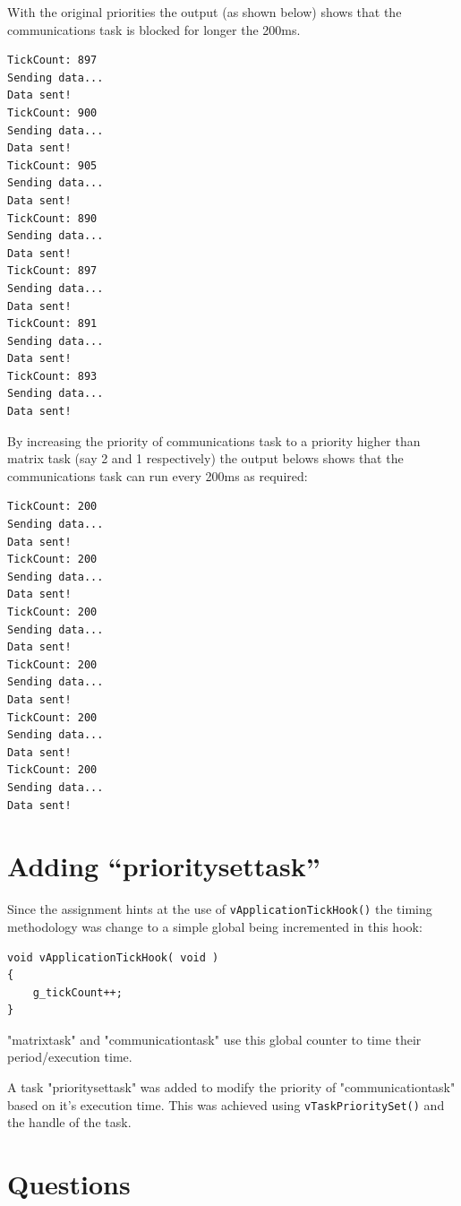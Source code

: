 \documentclass{article}
\begin{document}
With the original priorities the output (as shown below) shows that the communications task is blocked for longer the 200ms.

\begin{lstlisting}
TickCount: 897
Sending data...
Data sent!
TickCount: 900
Sending data...
Data sent!
TickCount: 905
Sending data...
Data sent!
TickCount: 890
Sending data...
Data sent!
TickCount: 897
Sending data...
Data sent!
TickCount: 891
Sending data...
Data sent!
TickCount: 893
Sending data...
Data sent!
\end{lstlisting}

By increasing the priority of communications task to a priority higher than matrix task (say 2 and 1 respectively) the output belows shows that the
communications task can run every 200ms as required:

\begin{lstlisting}
TickCount: 200
Sending data...
Data sent!
TickCount: 200
Sending data...
Data sent!
TickCount: 200
Sending data...
Data sent!
TickCount: 200
Sending data...
Data sent!
TickCount: 200
Sending data...
Data sent!
TickCount: 200
Sending data...
Data sent!
\end{lstlisting}


\section{Adding ``prioritysettask''}

Since the assignment hints at the use of \verb|vApplicationTickHook()| the timing methodology was change to a simple global being incremented in this hook:

\begin{lstlisting}
void vApplicationTickHook( void )
{
    g_tickCount++;
}
\end{lstlisting}

"matrixtask" and "communicationtask" use this global counter to time their period/execution time.

A task "prioritysettask" was added to modify the priority of "communicationtask" based on it's execution time. This was achieved using \verb|vTaskPrioritySet()| and the handle of the task.


\section{Questions}
\end{document}
